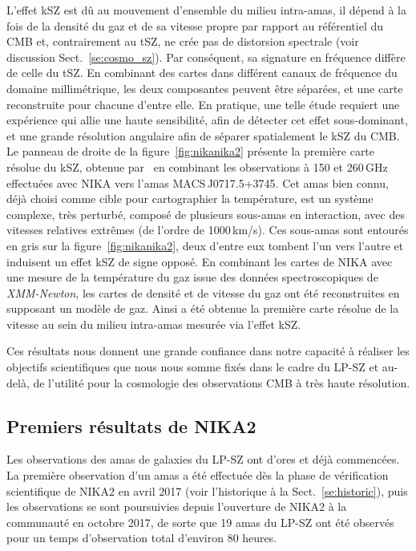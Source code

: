 L'effet kSZ est dû au mouvement d'ensemble du milieu intra-amas, il
dépend à la fois de la densité du gaz et de sa vitesse propre par
rapport au référentiel du CMB et, contrairement au tSZ, ne crée pas de
distorsion spectrale (voir discussion Sect.~\ref{se:cosmo_sz}). Par
conséquent, sa signature en fréquence diffère de celle du tSZ. En
combinant des cartes dans différent canaux de fréquence du domaine
millimétrique, les deux composantes peuvent être séparées, et une
carte reconstruite pour chacune d'entre elle. En pratique, une telle
étude requiert une expérience qui allie une haute sensibilité, afin de
détecter cet effet sous-dominant, et une grande résolution angulaire
afin de séparer spatialement le kSZ du CMB. Le panneau de droite de la
figure~\ref{fig:nikanika2} présente la première carte résolue
du kSZ, obtenue par~\citet{Adam2017kSZ} en combinant les
observations à 150 et 260\,GHz effectuées avec NIKA vers l'amas
MACS\,J0717.5+3745. Cet amas bien connu, déjà choisi comme
cible pour cartographier la température, est un système complexe, très
perturbé, composé de plusieurs sous-amas en interaction, avec des
vitesses relatives extrêmes (de l'ordre de 1000\,km/s). Ces sous-amas
sont entourés en gris sur la figure~\ref{fig:nikanika2}, deux d'entre
eux tombent l'un vers l'autre et induisent un effet kSZ de signe
opposé. En combinant les cartes de NIKA avec une mesure de la
température du gaz issue des données spectroscopiques de
\emph{XMM-Newton}, les cartes de densité et de vitesse du gaz ont été
reconstruites en supposant un modèle de gaz. Ainsi a été obtenue la
première carte résolue de la vitesse au sein du milieu intra-amas
mesurée via l'effet kSZ.

Ces résultats nous donnent une grande confiance dans notre capacité à
réaliser les objectifs scientifiques que nous nous somme fixés dans le
cadre du LP-SZ et au-delà, de l'utilité pour la cosmologie des
observations CMB à très haute résolution.

\subsection{Premiers résultats de NIKA2}

Les observations des amas de galaxies du LP-SZ ont d'ores et déjà
commencées. La première observation d'un amas a été
effectuée dès la phase de vérification scientifique de NIKA2 en avril
2017 (voir l'historique à la Sect.~\ref{se:historic}), puis les observations se
sont poursuivies depuis l'ouverture de NIKA2 à la communauté en
octobre 2017, de sorte que 19 amas du LP-SZ ont été observés pour un
temps d'observation total d'environ 80 heures.


